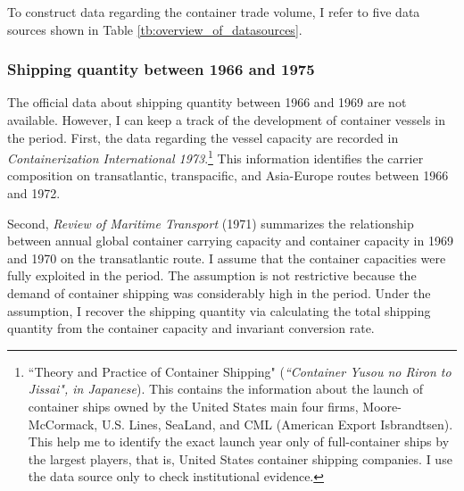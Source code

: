 To construct data regarding the container trade volume, I refer to five data sources shown in Table \ref{tb:overview_of_datasources}.

\subsubsection{Shipping quantity between 1966 and 1975}

The official data about shipping quantity between 1966 and 1969 are not available. However, I can keep a track of the development of container vessels in the period. First, the data regarding the vessel capacity are recorded in \textit{Containerization International 1973}.\footnote{``Theory and Practice of Container Shipping" (\textit{``Container Yusou no Riron to Jissai", in Japanese}). This contains the information about the launch of container ships owned by the United States main four firms, Moore-McCormack, U.S. Lines, SeaLand, and CML (American Export Isbrandtsen). This help me to identify the exact launch year only of full-container ships by the largest players, that is, United States container shipping companies. I use the data source only to check institutional evidence.} This information identifies the carrier composition on transatlantic, transpacific, and Asia-Europe routes between 1966 and 1972.

Second, \textit{Review of Maritime Transport} (1971) summarizes the relationship between annual global container carrying capacity and container capacity in 1969 and 1970 on the transatlantic route. I assume that the container capacities were fully exploited in the period. The assumption is not restrictive because the demand of container shipping was considerably high in the period. Under the assumption, I recover the shipping quantity via calculating the total shipping quantity from the container capacity and invariant conversion rate.

